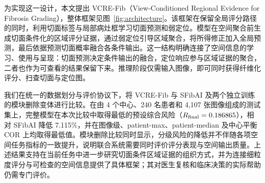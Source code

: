 为实现这一设计，本文提出 VCRE-Fib（View-Conditioned Regional Evidence for Fibrosis Grading），整体框架见图~\ref{fig:architecture}。该框架在保留全局评分路径的同时，利用切面标签与局部病灶框学习切面预测和弱定位。模型在空间聚合前生成切面条件化的区域评分证据，通过弱定位引导区域聚合，将所得修正加入全局预测，最后依据预测切面概率融合各条件输出。这一结构明确连接了空间信息的学习、使用与呈现：切面预测决定条件输出的融合，定位响应参与区域证据的聚合，二者也作为可查看的结果保留下来。推理阶段仅需输入图像，即可同时获得纤维化评分、扫查切面与定位图。

我们在统一的数据划分与评价协议下，将 VCRE-Fib 与 SFibAI 及两个独立训练的模块删除变体进行比较。在由 4 个中心、240 名患者和 4,107 张图像组成的测试集上，完整模型在本次比较中取得最低的预设综合风险（$R_{\mathrm{final}}=0.186865$），相对 SFibAI 降低 7.115\%，并在图像级、patient-max、patient-median 及中心平衡 COR 上均取得最低值。模块删除比较同时显示，分级风险的降低并不伴随各项空间任务指标的一致提升，说明联合系统需要同时评价评分表现与空间输出质量。上述结果支持在当前任务中进一步研究切面条件区域证据的组织方式，并为连接细粒度评分与可检查的空间信息提供了具体框架；其对医生复核和临床决策的实际帮助仍需专门评价。
